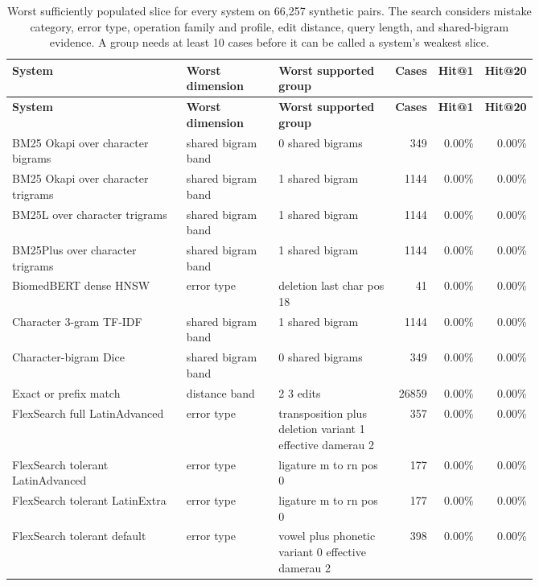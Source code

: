 \begin{scriptsize}
\setlength{\tabcolsep}{1.5pt}
\renewcommand{\arraystretch}{1.05}
\begin{longtable}{@{}L{0.35\linewidth}L{0.18\linewidth}L{0.23\linewidth}rrr@{}}
\caption{Worst sufficiently populated slice for every system on 66,257 synthetic pairs. The search considers mistake category, error type, operation family and profile, edit distance, query length, and shared-bigram evidence. A group needs at least 10 cases before it can be called a system's weakest slice.}\label{tab:expanded-synthetic-weakest-slice}\\
\toprule
\textbf{System} & \textbf{Worst dimension} & \textbf{Worst supported group} & \textbf{Cases} & \textbf{Hit@1} & \textbf{Hit@20} \\
\midrule
\endfirsthead
\toprule
\textbf{System} & \textbf{Worst dimension} & \textbf{Worst supported group} & \textbf{Cases} & \textbf{Hit@1} & \textbf{Hit@20} \\
\midrule
\endhead
BM25 Okapi over character bigrams & shared bigram band & 0 shared bigrams & 349 & 0.00\% & 0.00\% \\
BM25 Okapi over character trigrams & shared bigram band & 1 shared bigram & 1144 & 0.00\% & 0.00\% \\
BM25L over character trigrams & shared bigram band & 1 shared bigram & 1144 & 0.00\% & 0.00\% \\
BM25Plus over character trigrams & shared bigram band & 1 shared bigram & 1144 & 0.00\% & 0.00\% \\
BiomedBERT dense HNSW & error type & deletion last char pos 18 & 41 & 0.00\% & 0.00\% \\
Character 3-gram TF-IDF & shared bigram band & 1 shared bigram & 1144 & 0.00\% & 0.00\% \\
Character-bigram Dice & shared bigram band & 0 shared bigrams & 349 & 0.00\% & 0.00\% \\
Exact or prefix match & distance band & 2 3 edits & 26859 & 0.00\% & 0.00\% \\
FlexSearch full LatinAdvanced & error type & transposition plus deletion variant 1  effective damerau 2 & 357 & 0.00\% & 0.00\% \\
FlexSearch tolerant LatinAdvanced & error type & ligature m to rn pos 0 & 177 & 0.00\% & 0.00\% \\
FlexSearch tolerant LatinExtra & error type & ligature m to rn pos 0 & 177 & 0.00\% & 0.00\% \\
FlexSearch tolerant default & error type & vowel plus phonetic variant 0  effective damerau 2 & 398 & 0.00\% & 0.00\% \\

\end{longtable}
\end{scriptsize}
